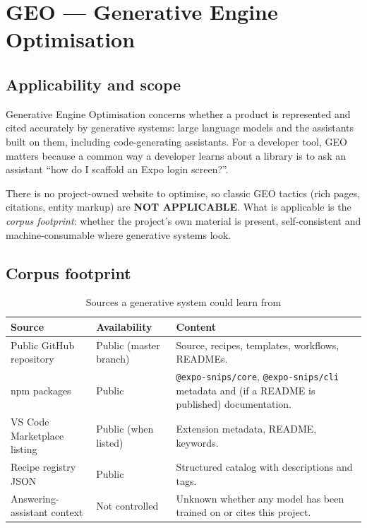 \chapter{GEO --- Generative Engine Optimisation}
\label{ch:geo}

\section{Applicability and scope}

Generative Engine Optimisation concerns whether a product is represented and
cited accurately by generative systems: large language models and the assistants
built on them, including code-generating assistants. For a developer tool, GEO
matters because a common way a developer learns about a library is to ask an
assistant ``how do I scaffold an Expo login screen?''.

There is no project-owned website to optimise, so classic GEO tactics
(rich pages, citations, entity markup) are \textbf{NOT APPLICABLE}. What is
applicable is the \emph{corpus footprint}: whether the project's own material is
present, self-consistent and machine-consumable where generative systems look.

\section{Corpus footprint}

\begin{longtable}{p{4.4cm}p{2.8cm}p{7cm}}
\caption{Sources a generative system could learn from}\\
\toprule
\textbf{Source} & \textbf{Availability} & \textbf{Content} \\
\midrule

Public GitHub repository & Public (master branch) & Source, recipes, templates,
workflows, READMEs. \\
npm packages & Public & \texttt{@expo-snips/core}, \texttt{@expo-snips/cli}
metadata and (if a README is published) documentation. \\
VS Code Marketplace listing & Public (when listed) & Extension metadata, README,
keywords. \\
Recipe registry JSON & Public & Structured catalog with descriptions and tags. \\
Answering-assistant context & Not controlled & Unknown whether any model has been
trained on or cites this project. \\
\bottomrule
\end{longtable}

